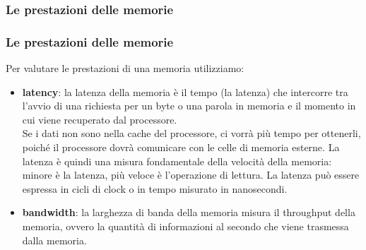\subsubsection[Le prestazioni delle memorie]{Le prestazioni delle memorie}
\begin{frame}
	\frametitle{Le prestazioni delle memorie}
	
	\begin{block}{}
		Per valutare le prestazioni di una memoria utilizziamo:
		\begin{itemize}
			\item \textbf{latency}: la latenza della memoria è il tempo (la latenza) che intercorre tra l'avvio di una richiesta per un byte o una parola in memoria e il momento in cui viene recuperato dal processore.\\
				Se i dati non sono nella cache del processore, ci vorrà più tempo per ottenerli, poiché il processore dovrà comunicare con le celle di memoria esterne. La latenza è quindi una misura fondamentale della velocità della memoria: minore è la latenza, più veloce è l'operazione di lettura.
				La latenza può essere espressa in cicli di clock o in tempo misurato in nanosecondi. \pause
			\item \textbf{bandwidth}: la larghezza di banda della memoria misura il throughput della memoria, ovvero la quantità di informazioni al secondo che viene trasmessa dalla memoria.
		\end{itemize}
		
	\end{block}
	
\end{frame}


